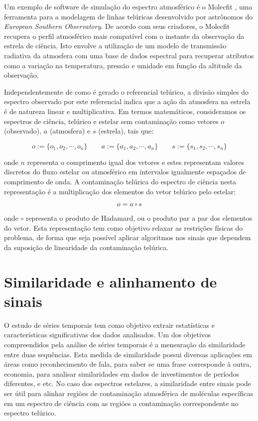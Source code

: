 Um exemplo de software de simulação do espectro atmosférico é o Molecfit \citep{smette2015molecfit}, uma ferramenta para a modelagem de linhas telúricas desenvolvido por astrônomos do \textit{European Southern Observatory}. De acordo com seus criadores, o Molecfit recupera o perfil atmosférico mais compatível com o instante da observação da estrela de ciência. Isto envolve a utilização de um modelo de transmissão radiativa da atmosfera com uma base de dados espectral para recuperar atributos como a variação na temperatura, pressão e umidade em função da altitude da observação.

Independentemente de como é gerado o referencial telúrico, 
a divisão simples do espectro observado por este referencial indica que a ação da atmosfera na estrela é de natureza linear e multiplicativa.  Em termos matemáticos, consideramos os espectros de ciência, telúrico e estelar sem contaminação como vetores $o$ (observado), $a$ (atmosfera) e $s$ (estrela), tais que:

\begin{equation*}
    o := \{o_1, o_2, \cdots, o_{n}\} \qquad a := \{a_1, a_2, \cdots, a_{n}\} \qquad s := \{s_1, s_2, \cdots, s_{n}\} 
\end{equation*}

\noindent onde $n$ representa o comprimento igual dos vetores e estes representam valores discretos do fluxo estelar ou atmosférico em intervalos igualmente espaçados de comprimento de onda. A contaminação telúrica do espectro de ciência nesta representação é a multiplicação dos elementos do vetor telúrico pelo estelar:

\begin{equation*}
    o = a \circ s
\end{equation*}

\noindent onde $\circ$ representa o produto de Hadamard, ou o produto par a par dos elementos do vetor. Esta representação tem como objetivo relaxar as restrições físicas do problema, de forma que seja possível aplicar algoritmos nos sinais que dependem da suposição de linearidade da contaminação telúrica.


\section{Similaridade e alinhamento de sinais}

O estudo de séries temporais tem como objetivo extrair estatísticas e características significativas dos dados analisados. Um dos objetivos compreendidos pela análise de séries temporais é a mensuração da similaridade entre duas sequências. Esta medida de similaridade possui diversas aplicações em áreas como reconhecimento de fala, para saber se uma frase corresponde à outra, economia, para analisar similaridades em dados de investimentos de períodos diferentes, e etc. No caso dos espectros estelares, a similaridade entre sinais pode ser útil para alinhar regiões de contaminação atmosférica de moléculas específicas em um espectro de ciência com as regiões a contaminação correspondente no espectro telúrico.

